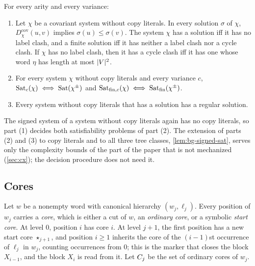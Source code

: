 \begin{theorem}\label{thm:bg-nsse-sat}
For every arity and every variance:
\begin{enumerate}[leftmargin=*]
\item Let $\chi$ be a covariant system without copy literals. In every
  solution $\sigma$ of $\chi$, $D^{\mathrm{cov}}_\chi(u,v)$ implies $\sigma(u)\le\sigma(v)$.
  The system $\chi$ has a solution iff it has no label clash, and a finite
  solution iff it has neither a label clash nor a cycle clash. If $\chi$ has no
  label clash, then it has a cycle clash iff it has one whose word $\eta$ has
  length at most $\lvert V\rvert^2$.
\item For every system $\chi$ without copy literals and every variance
  $c$, $\operatorname{Sat}_c(\chi)\iff\operatorname{Sat}(\chi^\pm)$ and
  $\operatorname{Sat}_{\mathrm{fin},c}(\chi)\iff\operatorname{Sat}_{\mathrm{fin}}(\chi^\pm)$.
\item Every system without copy literals that has a solution has a regular
  solution.
\end{enumerate}
\end{theorem}

The signed system of a system without copy literals again has no copy
literals, so part (1) decides both satisfiability problems of part (2). The
extension of parts (2) and (3) to copy literals and to all three tree classes,
\cref{lem:bg-signed-sat}, serves only the complexity bounds of the part of the
paper that is not mechanized (\cref{sec:cx}); the decision procedure does not
need it.

\subsection{Cores}\label{app:bg-cores}

Let $w$ be a nonempty word with canonical hierarchy $(w_j,\ell_j)$. Every
position of $w_j$ carries a \emph{core}, which is either a cut of $w$, an
\emph{ordinary core}, or a symbolic \emph{start core}. At level $0$, position
$i$ has core $i$. At level $j+1$, the first position has a new start core
$\star_{j+1}$, and position $i\ge1$ inherits the core of the $(i-1)$st
occurrence of $\ell_j$ in $w_j$, counting occurrences from $0$; this is the
marker that closes the block $X_{i-1}$, and the block $X_i$ is read from it.
Let $C_j$ be the set of ordinary cores of $w_j$.

